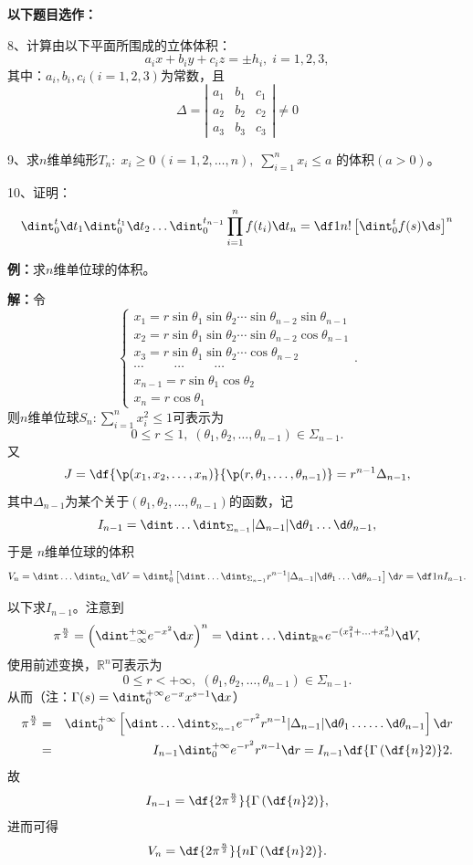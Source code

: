 {\bf 以下题目选作：}

\bigskip

8、计算由以下平面所围成的立体体积：
$$a_ix+b_iy+c_iz=\pm h_i,\;i=1,2,3,$$
其中：$a_i,b_i,c_i(i=1,2,3)$为常数，且
$$\Delta=\left|\begin{array}{ccc}
a_1 & b_1 & c_1\\ a_2 & b_2 & c_2 \\ a_3 & b_3 & c_3
\end{array}\right|\ne 0$$

9、求$n$维单纯形$T_n:\; x_i\geq 0\,(i=1,2,\ldots,n),\;
\sum\limits_{i=1}^nx_i\leq a$
的体积$(a>0)$。

10、证明：
$$\dint_0^t\d t_1\dint_0^{t_1}\d t_2\ldots
\dint_0^{t_{n-1}}\prod\limits_{i=1}^nf(t_i)\d t_n
=\df 1{n!}\left[\dint_0^tf(s)\d s\right]^n$$

\newpage

{\bf 例：}求$n$维单位球的体积。

{\bf 解：}令
$$
\left\{
\begin{array}{l}
x_1=r\sin\theta_1\sin\theta_2\cdots\sin\theta_{n-2}\sin\theta_{n-1}\\
x_2=r\sin\theta_1\sin\theta_2\cdots\sin\theta_{n-2}\cos\theta_{n-1}\\
x_3=r\sin\theta_1\sin\theta_2\cdots\cos\theta_{n-2}\\
\cdots\hspace{1cm}\cdots\hspace{1cm}\cdots\\
x_{n-1}=r\sin\theta_1\cos\theta_2\\
x_n=r\cos\theta_1
\end{array}
\right..
$$
则$n$维单位球$S_n:\sum\limits_{i=1}^nx^2_i\leq1$可表示为
$$0\leq r\leq 1,\;(\theta_1,\theta_2,\ldots,\theta_{n-1})\in\Sigma_{n-1}.$$
又
$$J=\df{\p(x_1,x_2,\ldots,x_n)}{\p(r,\theta_1,\ldots,\theta_{n-1})}
=r^{n-1}\Delta_{n-1},$$
其中$\Delta_{n-1}$为某个关于$(\theta_1,\theta_2,\ldots,\theta_{n-1})$的函数，记
$$I_{n-1}=\dint\ldots\dint_{\Sigma_{n-1}}|\Delta_{n-1}|
\d\theta_1\ldots\d\theta_{n-1},$$
于是
$n$维单位球的体积
$$V_n=\dint\ldots\dint_{\Omega_n}\d V
=\dint_0^1\left[\dint\ldots\dint_{\Sigma_{n-1}}r^{n-1}|\Delta_{n-1}|
\d\theta_1\ldots\d\theta_{n-1}\right]\d r=\df1nI_{n-1}.$$

以下求$I_{n-1}$。注意到
$$\pi^{\frac n2}=\left(\dint_{-\infty}^{+\infty}e^{-x^2}\d x\right)^n
=\dint\ldots\dint_{\mathbb{R}^n}e^{-(x_1^2+\ldots+x_n^2)}\d V,$$
使用前述变换，$\mathbb{R}^n$可表示为
$$0\leq r<+\infty,
\;(\theta_1,\theta_2,\ldots,\theta_{n-1})\in\Sigma_{n-1}.$$
从而（注：$\Gamma(s)=\dint_0^{+\infty}e^{-x}x^{s-1}\d x$）
\begin{eqnarray*}
	\pi^{\frac n2}&=&\dint_0^{+\infty}
	\left[\dint\ldots\dint_{\Sigma_{n-1}}e^{-r^2}r^{n-1}|\Delta_{n-1}|
	\d\theta_1\ldots\ldots\d\theta_{n-1}\right]\d r\\
	&=&I_{n-1}\dint_0^{+\infty}e^{-r^2}r^{n-1}\d r
	=I_{n-1}\df{\Gamma\left(\df{n}2\right)}2.
\end{eqnarray*}
故
$$I_{n-1}=\df{2\pi^{\frac n2}}{\Gamma\left(\df{n}2\right)},$$
进而可得
$$V_n=\df{2\pi^{\frac n2}}{n\Gamma\left(\df{n}2\right)}.$$

